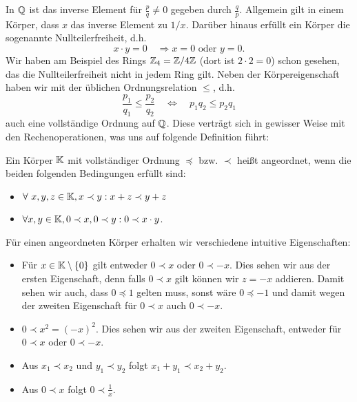 In \(\mathbb{Q}\) ist das inverse Element für \(\frac{p}q \neq 0\) gegeben durch \(\frac{q}p\). Allgemein gilt in einem Körper, dass \(x\) das inverse Element zu \(1/x\). Darüber hinaus erfüllt ein Körper die sogenannte Nullteilerfreiheit, d.h.
\begin{equation*}
x \cdot y = 0 \quad \Rightarrow x = 0 \text{ oder } y =0.
\end{equation*}
Wir haben am Beispiel des Rings \(\mathbb{Z}_4=\mathbb{Z}/4\mathbb{Z}\) (dort ist \(2 \cdot 2 = 0\)) schon gesehen, das die Nullteilerfreiheit nicht in jedem Ring gilt.
Neben der Körpereigenschaft haben wir mit der üblichen Ordnungsrelation \(\leq\), d.h.
\begin{equation*}
\frac{p_1}{q_1} \leq \frac{p_2}{q_2} \quad \Leftrightarrow \quad p_1 q_2 \leq p_2 q_1
\end{equation*}
auch eine vollständige Ordnung auf \(\mathbb{Q}\). Diese verträgt sich in gewisser Weise mit den Rechenoperationen, was uns auf folgende Definition führt:
\label{grundlagen/zahlensysteme:definition-10}
\begin{definition}{}{}



Ein Körper \(\mathbb{K}\) mit vollständiger Ordnung \(\preceq\) bzw. \(\prec\)  heißt angeordnet, wenn die beiden folgenden Bedingungen erfüllt sind:
\begin{itemize}
\item {} 
\(\forall~x,y,z \in \mathbb{K}, x \prec y: x+z \prec y+z\)

\item {} 
\(\forall x,y \in \mathbb{K}, 0 \prec x, 0 \prec y: 0 \prec x \cdot y\).

\end{itemize}
\end{definition}

Für einen angeordneten Körper erhalten wir verschiedene intuitive Eigenschaften:
\begin{itemize}
\item {} 
Für \(x \in \mathbb{K} \setminus \{0\}\) gilt entweder \(0 \prec x\) oder \(0 \prec -x\). Dies sehen wir aus der ersten Eigenschaft, denn falls \(0 \prec x\) gilt können wir \(z=-x\) addieren. Damit sehen wir auch, dass \( 0 \preceq 1\) gelten muss, sonst wäre \(0 \preceq -1\) und damit wegen der zweiten Eigenschaft für \(0 \prec x \) auch \(0 \prec -x\).

\item {} 
\(0 \prec x^2 = (-x)^2\). Dies sehen wir aus der zweiten Eigenschaft, entweder für \(0 \prec x\) oder \(0 \prec -x\).

\item {} 
Aus \(x_1 \prec x_2\) und \(y_1 \prec y_2\) folgt \(x_1 + y_1 \prec x_2 + y_2\).

\item {} 
Aus \(0 \prec x\) folgt \(0 \prec \frac{1}x\).

\end{itemize}

